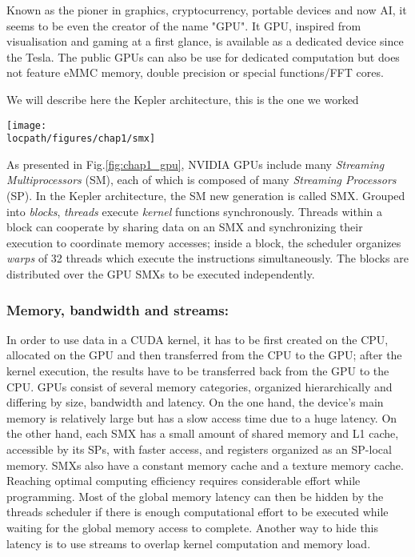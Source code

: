Known as the pioner in graphics, cryptocurrency, portable devices and now AI, it seems to be even the creator of the name "GPU".
It GPU, inspired from visualisation and gaming at a first glance, is available as a dedicated device  since the Tesla. 
The public GPUs can also be use for dedicated computation but does not feature eMMC memory, double precision or special functions/FFT cores. 

We will describe here the Kepler architecture, this is the one we worked

\begin{figure*}[t!]
\centering
\setlength\fboxsep{0pt}
\setlength\fboxrule{0.25pt}
\texttt{[image: \\locpath/figures/chap1/smx]}
\caption{NVIDIA GPU and CUDA architecture overview}
 \label{fig:chap1_gpu}
\end{figure*}

As presented in Fig.\ref{fig:chap1_gpu}, NVIDIA GPUs include many \emph{Streaming Multiprocessors} (SM), each of which is composed of many \emph{Streaming Processors} (SP). In the Kepler architecture, the SM new generation is called SMX.
%
Grouped into \emph{blocks}, \textit{threads} execute \emph{kernel} functions synchronously.
Threads within a block can cooperate by sharing data on an SMX and synchronizing their execution to coordinate memory accesses; inside a block, the scheduler organizes \emph{warps} of 32 threads which execute the instructions simultaneously.
The blocks are distributed over the GPU SMXs to be executed independently.

\subsubsection{Memory, bandwidth and streams:}

In order to use data in a CUDA kernel, it has to be first created on the CPU, allocated on the GPU and then transferred from the CPU to the GPU; after the kernel execution, the results have to be transferred back from the GPU to the CPU. 
GPUs consist of several memory categories, organized hierarchically and differing by size, bandwidth and latency.   
On the one hand, the device's main memory is relatively large but has a slow access time due to a huge latency. 
On the other hand, each SMX has a small amount of shared memory and L1 cache, accessible by its SPs, with faster access, and registers organized as an SP-local memory. 
SMXs also have a constant memory cache and a texture memory cache.
Reaching optimal computing efficiency requires considerable effort while programming.
Most of the global memory latency can then be hidden by the threads scheduler if there is enough computational effort to be executed while waiting for the global memory access to complete. Another way to hide this latency is to use streams to overlap kernel computation and memory load. 

